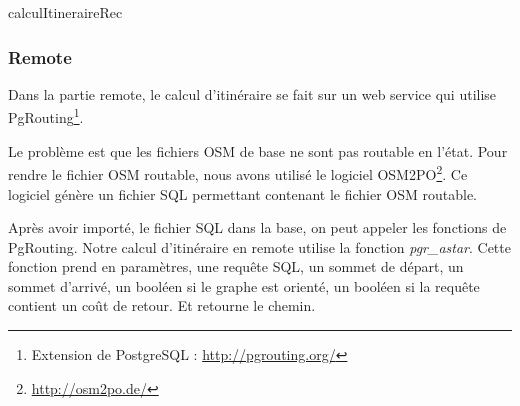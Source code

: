 \begin{algorithm}[H]
\caption{calculItineraireRec\label{calculItiRec}}
\end{algorithm}

\subsubsection{Remote}
Dans la partie remote, le calcul d'itinéraire se fait sur un web service qui utilise PgRouting\footnote{Extension de PostgreSQL : \url{http://pgrouting.org/}}.

Le problème est que les fichiers OSM de base ne sont pas routable en l'état. Pour rendre le fichier OSM routable, nous avons utilisé le logiciel OSM2PO\footnote{\url{http://osm2po.de/}}. Ce logiciel génère un fichier SQL permettant contenant le fichier OSM routable.

Après avoir importé, le fichier SQL dans la base, on peut appeler les fonctions de PgRouting. Notre calcul d'itinéraire en remote utilise la fonction \emph{pgr\_astar}. Cette fonction prend en paramètres, une requête SQL, un sommet de départ, un sommet d'arrivé, un booléen si le graphe est orienté, un booléen si la requête contient un coût de retour. Et retourne le chemin.